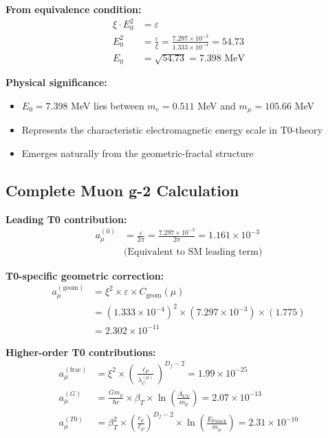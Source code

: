 \documentclass[12pt,a4paper]{article}
\numberwithin{equation}{section}
\newcommand{\xipar}{\xi}
\newcommand{\epsilonT}{\varepsilon}
\newcommand{\Cgeom}{C_{\text{geom}}}
\newcommand{\Df}{D_f}
\newcommand{\Eo}{E_0}
\newcommand{\lP}{\ell_P}
\newcommand{\lambdaC}{\lambda_C}
\begin{document}
	\textbf{From equivalence condition:}
	\begin{align}
		\xipar \cdot \Eo^2 &= \epsilonT\\
		\Eo^2 &= \frac{\epsilonT}{\xipar} = \frac{7.297 \times 10^{-3}}{1.333 \times 10^{-4}} = 54.73\\
		\Eo &= \sqrt{54.73} = 7.398 \text{ MeV}
		\label{eq:e0_verification}
	\end{align}
	
	\textbf{Physical significance:}
	\begin{itemize}
		\item $\Eo = 7.398$ MeV lies between $m_e = 0.511$ MeV and $m_\mu = 105.66$ MeV
		\item Represents the characteristic electromagnetic energy scale in T0-theory
		\item Emerges naturally from the geometric-fractal structure
	\end{itemize}
	
	\subsection{Complete Muon g-2 Calculation}
	
	\textbf{Leading T0 contribution:}
	\begin{align}
		a_\mu^{(0)} &= \frac{\epsilonT}{2\pi} = \frac{7.297 \times 10^{-3}}{2\pi} = 1.161 \times 10^{-3}\\
		&\text{(Equivalent to SM leading term)}
		\label{eq:muon_leading}
	\end{align}
	
	\textbf{T0-specific geometric correction:}
	\begin{align}
		a_\mu^{(\text{geom})} &= \xipar^2 \times \epsilonT \times \Cgeom(\mu)\\
		&= (1.333 \times 10^{-4})^2 \times (7.297 \times 10^{-3}) \times (1.775)\\
		&= 2.302 \times 10^{-11}
		\label{eq:muon_geometric}
	\end{align}
	
	\textbf{Higher-order T0 contributions:}
	\begin{align}
		a_\mu^{(\text{frac})} &= \xipar^2 \times \left(\frac{\lP}{\lambdaC^{(\mu)}}\right)^{\Df-2} = 1.99 \times 10^{-25}\\
		a_\mu^{(G)} &= \frac{G m_\mu}{\hbar c} \times \beta_T \times \ln\left(\frac{\Lambda_{\text{UV}}}{m_\mu}\right) = 2.07 \times 10^{-13}\\
		a_\mu^{(T0)} &= \beta_T^2 \times \left(\frac{r_\mu}{\lP}\right)^{\Df-2} \times \ln\left(\frac{E_{\text{Planck}}}{m_\mu}\right) = 2.31 \times 10^{-10}
		\label{eq:muon_higher_order}
	\end{align}
	
\end{document}

